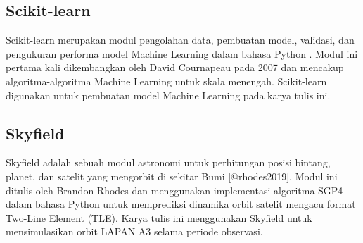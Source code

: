 \subsection{Scikit-learn}

Scikit-learn merupakan modul pengolahan data, pembuatan model, validasi, dan
pengukuran performa model Machine Learning dalam bahasa Python \cite{pedregosa2011}.
Modul ini pertama kali dikembangkan oleh David Cournapeau pada 2007 dan
mencakup algoritma-algoritma Machine Learning untuk skala menengah.
Scikit-learn digunakan untuk pembuatan model Machine Learning pada karya tulis
ini.

\subsection{Skyfield}

Skyfield adalah sebuah modul astronomi untuk perhitungan posisi bintang,
planet, dan satelit yang mengorbit di sekitar Bumi [@rhodes2019]. Modul ini
ditulis oleh Brandon Rhodes dan menggunakan implementasi algoritma SGP4 dalam
bahasa Python \cite{rodriguez} untuk memprediksi dinamika orbit satelit mengacu
format Two-Line Element (TLE). Karya tulis ini menggunakan Skyfield untuk
mensimulasikan orbit LAPAN A3 selama periode observasi.

